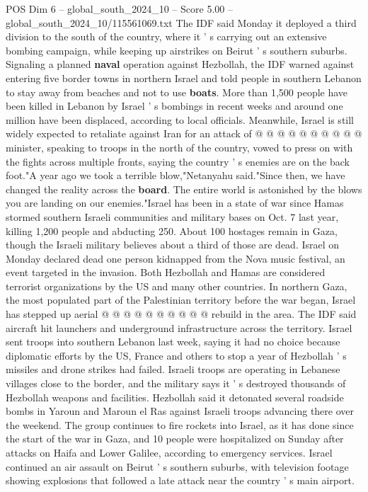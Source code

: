 \begin{textsample}{POS Dim 6 – global\_south\_2024\_10 – Score 5.00 – global\_south\_2024\_10/115561069.txt}
The IDF said Monday it deployed a third division to the south of the country, where it ' s carrying out an extensive bombing campaign, while keeping up airstrikes on Beirut ' s southern suburbs.
Signaling a planned \textbf{naval} operation against Hezbollah, the IDF warned against entering five border towns in northern Israel and told people in southern Lebanon to stay away from beaches and not to use \textbf{boats}.
More than 1,500 people have been killed in Lebanon by Israel ' s bombings in recent weeks and around one million have been displaced, according to local officials.
Meanwhile, Israel is still widely expected to retaliate against Iran for an attack of @ @ @ @ @ @ @ @ @ @ minister, speaking to troops in the north of the country, vowed to press on with the fights across multiple fronts, saying the country ' s enemies are on the back foot."A year ago we took a terrible blow,"Netanyahu said."Since then, we have changed the reality across the \textbf{board}.
The entire world is astonished by the blows you are landing on our enemies."Israel has been in a state of war since Hamas stormed southern Israeli communities and military bases on Oct. 7 last year, killing 1,200 people and abducting 250.
About 100 hostages remain in Gaza, though the Israeli military believes about a third of those are dead.
Israel on Monday declared dead one person kidnapped from the Nova music festival, an event targeted in the invasion.
Both Hezbollah and Hamas are considered terrorist organizations by the US and many other countries.
In northern Gaza, the most populated part of the Palestinian territory before the war began, Israel has stepped up aerial @ @ @ @ @ @ @ @ @ @ rebuild in the area.
The IDF said aircraft hit launchers and underground infrastructure across the territory.
Israel sent troops into southern Lebanon last week, saying it had no choice because diplomatic efforts by the US, France and others to stop a year of Hezbollah ' s missiles and drone strikes had failed.
Israeli troops are operating in Lebanese villages close to the border, and the military says it ' s destroyed thousands of Hezbollah weapons and facilities.
Hezbollah said it detonated several roadside bombs in Yaroun and Maroun el Ras against Israeli troops advancing there over the weekend.
The group continues to fire rockets into Israel, as it has done since the start of the war in Gaza, and 10 people were hospitalized on Sunday after attacks on Haifa and Lower Galilee, according to emergency services.
Israel continued an air assault on Beirut ' s southern suburbs, with television footage showing explosions that followed a late attack near the country ' s main airport.

\end{textsample}
